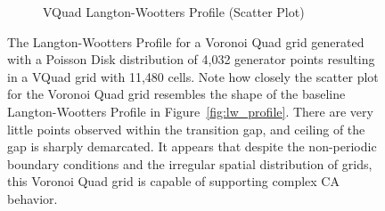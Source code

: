 \documentclass[a4paper,11pt,twoside]{report}
\begin{document}
\begin{figure}[htp]
\begin{subfigure}[t]{0.6\textwidth}
  \caption{VQuad Langton-Wootters Profile (Scatter Plot)}
  \label{fig:vor_lw_scatter}
\end{subfigure}
\caption[Voronoi Quad Langton-Wootters Profile]{
  The Langton-Wootters Profile for a Voronoi Quad grid generated with a Poisson Disk distribution of 4,032 generator points resulting in a VQuad grid with 11,480 cells. Note how closely the scatter plot for the Voronoi Quad grid resembles the shape of the baseline Langton-Wootters Profile in Figure~\ref{fig:lw_profile}. There are very little points observed within the transition gap, and ceiling of the gap is sharply demarcated. It appears that despite the non-periodic boundary conditions and the irregular spatial distribution of grids, this Voronoi Quad grid is capable of supporting complex CA behavior.
}
\label{fig:vor_lw_profile}
\end{figure}
\end{document}
